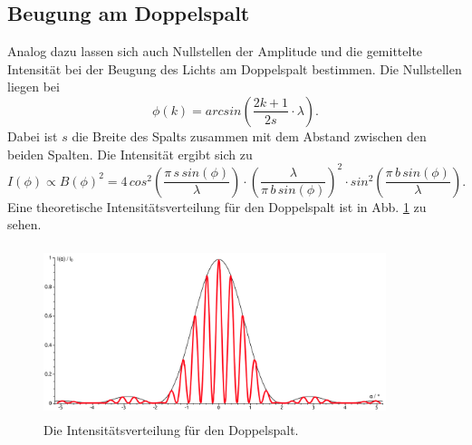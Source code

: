 \subsection{Beugung am Doppelspalt}
Analog dazu lassen sich auch Nullstellen der Amplitude und 
die gemittelte Intensität bei der Beugung des Lichts am 
Doppelspalt bestimmen.
Die Nullstellen liegen bei 
\begin{equation*}
    \phi(k) = arcsin \left(\frac{2k+1}{2s}\cdot \lambda \right).
\end{equation*}
Dabei ist $s$ die Breite des Spalts zusammen mit
dem Abstand zwischen den beiden Spalten.
\newline
Die Intensität ergibt sich zu 
\begin{equation*}
    I(\phi) \propto B(\phi)^2 =4 \, cos^2 \left(\frac{\pi \, s \, sin(\phi)}{\lambda} \right)\cdot \left(\frac{\lambda}{\pi \, b \, sin(\phi)} \right)^2 \cdot sin^2 \left(\frac{\pi \, b \, sin(\phi)}{\lambda}\right).
\end{equation*}
Eine theoretische Intensitätsverteilung für den Doppelspalt
ist in Abb. \ref{fig:doppel} zu sehen.
\begin{figure}
    \centering
    \includegraphics[width=10cm, height=5cm]{build/Doppelspalt.png}
    \caption{Die Intensitätsverteilung für den Doppelspalt. \cite{doppel}}
    \label{fig:doppel}
\end{figure}